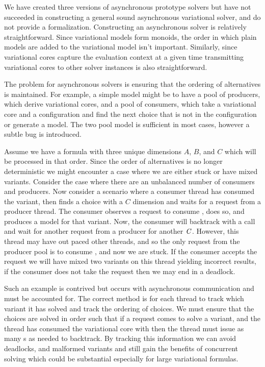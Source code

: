 We have created three versions of asynchronous prototype solvers but have not
succeeded in constructing a general sound asynchronous variational solver, and
do not provide a formalization. Constructing an asynchronous solver is
relatively straightforward. Since variational models form monoids, the order in
which plain models are added to the variational model isn't important.
Similarly, since variational cores capture the evaluation context at a given
time transmitting variational cores to other solver instances is also
straightforward.

The problem for asynchronous solvers is ensuring that the ordering of
alternatives is maintained. For example, a simple model might be to have a pool
of producers, which derive variational cores, and a pool of consumers, which
take a variational core and a configuration and find the next choice that is not
in the configuration or generate a model. The two pool model is sufficient in
most cases, however a subtle bug is introduced.

Assume we have a formula with three unique dimensions $A$, $B$, and $C$ which
will be processed in that order. Since the order of alternatives is no longer
deterministic we might encounter a case where we are either stuck or have mixed
variants. Consider the case where there are an unbalanced number of consumers
and producers. Now consider a scenario where a consumer thread has consumed the
 variant, then finds a choice with a $C$ dimension
and waits for a request from a producer thread. The consumer observes a request
to consume , does so, and produces a model for that variant.
Now, the consumer will backtrack with a  call and wait for another
request from a producer for another $\mathit{C}$. However, this thread may have out
paced other threads, and so the only request from the producer pool is to
consume , and now we are stuck. If the consumer accepts the
request we will have mixed two variants on this thread yielding incorrect
results, if the consumer does not take the request then we may end in a
deadlock.

Such an example is contrived but occurs with asynchronous communication and must
be accounted for. The correct method is for each thread to track which variant
it has solved and track the ordering of choices. We must ensure that the choices
are solved in order such that if a request comes to solve a 
variant, and the thread has consumed the variational core with 
then the thread must issue as many s as needed to backtrack. By tracking
this information we can avoid deadlocks, and malformed variants and still gain
the benefits of concurrent solving which could be substantial especially for
large variational formulas.


